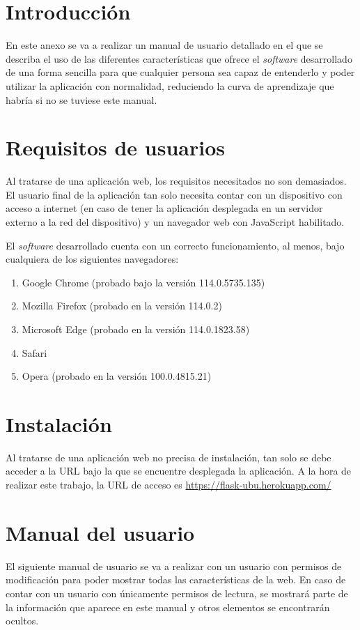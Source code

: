 
\section{Introducción}
En este anexo se va a realizar un manual de usuario detallado en el que se describa el uso de las diferentes características que ofrece el \textit{software} desarrollado de una forma sencilla para que cualquier persona sea capaz de entenderlo y poder utilizar la aplicación con normalidad, reduciendo la curva de aprendizaje que habría si no se tuviese este manual.

\section{Requisitos de usuarios}
Al tratarse de una aplicación web, los requisitos necesitados no son demasiados.
El usuario final de la aplicación tan solo necesita contar con un dispositivo con acceso a internet (en caso de tener la aplicación desplegada en un servidor externo a la red del dispositivo) y un navegador web con JavaScript habilitado.

El \textit{software} desarrollado cuenta con un correcto funcionamiento, al menos, bajo cualquiera de los siguientes navegadores:

\begin{enumerate}
\item Google Chrome (probado bajo la versión 114.0.5735.135)
\item Mozilla Firefox (probado en la versión 114.0.2)
\item Microsoft Edge (probado en la versión 114.0.1823.58)
\item Safari
\item Opera (probado en la versión 100.0.4815.21)
\end{enumerate}

\section{Instalación}
Al tratarse de una aplicación web no precisa de instalación, tan solo se debe acceder a la URL bajo la que se encuentre desplegada la aplicación. 
A la hora de realizar este trabajo, la URL de acceso es \url{https://flask-ubu.herokuapp.com/}

\section{Manual del usuario}
El siguiente manual de usuario se va a realizar con un usuario con permisos de modificación para poder mostrar todas las características de la web.
En caso de contar con un usuario con únicamente permisos de lectura, se mostrará parte de la información que aparece en este manual y otros elementos se encontrarán ocultos.

